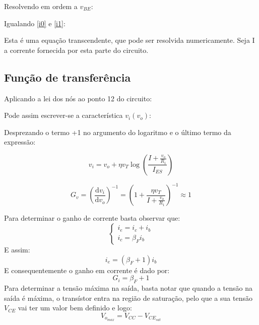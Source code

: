 \documentclass[%
  reprint,
  nofootinbib,
  amsmath,amssymb,
  aps,
  10pt,
  a4paper
]{revtex4-1}
\begin{document}
Resolvendo em ordem a $v_{BE}$:

Igualando \eqref{i0} e \eqref{i1}:

Esta é uma equação transcendente, que pode ser resolvida numericamente. Seja I a corrente fornecida por esta parte do circuito.

\subsection{Função de transferência}

Aplicando a lei dos nós ao ponto 12 do circuito:



Pode assim escrever-se a característica $v_i(v_o)$:


Desprezando o termo +1 no argumento do logaritmo e o último termo da expressão:

\begin{equation}
v_i=v_o+\eta v_T\log \left(\frac{I+\frac{v_o}{R_1}}{I_{ES}}\right)
\end{equation}

\begin{equation}
G_v=\left(\frac{\mathrm{d}v_i}{\mathrm{d}v_o}\right)^{-1}=\left(1+\frac{\eta v_T}{I+\frac{v_o}{R_1}}\right)^{-1}\approx 1
\label{eq:g_v}
\end{equation}

Para determinar o ganho de corrente basta observar que:
\begin{equation}
\begin{cases} i_e=i_c+i_b\\ i_c=\beta_F i_b
\end{cases}
\end{equation}
E assim:
\begin{equation}
i_e=(\beta_F+1)i_b
\end{equation}
E consequentemente o ganho em corrente é dado por:
\begin{equation}
G_i=\beta_F+1
\label{eq:g_i}
\end{equation}
Para determinar a tensão máxima na saída, basta notar que quando a tensão na saída é máxima, o transístor entra na região de saturação, pelo que a sua tensão $V_{CE}$ vai ter um valor bem definido e logo:
\begin{equation}
V_{o_{max}}=V_{CC}-V_{{CE}_{sat}}
\label{eq:sat}
\end{equation}
\end{document}
